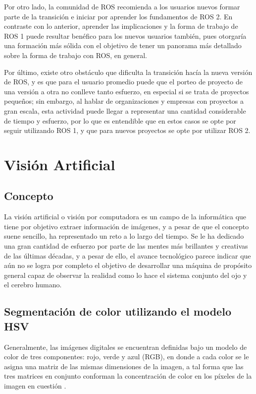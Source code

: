 Por otro lado, la comunidad de ROS recomienda a los usuarios nuevos formar parte de la transición e iniciar por aprender los fundamentos de ROS 2. En contraste con lo anterior, aprender las implicaciones y la forma de trabajo de ROS 1 puede resultar benéfico para los nuevos usuarios también, pues otorgaría una formación más sólida con el objetivo de tener un panorama más detallado sobre la forma de trabajo con ROS, en general.

Por último, existe otro obstáculo que dificulta la transición hacía la nueva versión de ROS, y es que para el usuario promedio puede que el porteo de proyecto de una versión a otra no conlleve tanto esfuerzo, en especial si se trata de proyectos pequeños; sin embargo, al hablar de organizaciones y empresas con proyectos a gran escala, esta actividad puede llegar a representar una cantidad considerable de tiempo y esfuerzo, por lo que es entendible que en estos casos se opte por seguir utilizando ROS 1, y que para nuevos proyectos se opte por utilizar ROS 2.

\section{Visión Artificial}

\subsection{Concepto}

La visión artificial o visión por computadora es un campo de la informática que tiene por objetivo extraer información de imágenes, y a pesar de que el concepto suene sencillo, ha representado un reto a lo largo del tiempo. Se le ha dedicado una gran cantidad de esfuerzo por parte de las mentes más brillantes y creativas de las últimas décadas, y a pesar de ello, el avance tecnológico parece indicar que aún no se logra por completo el objetivo de desarrollar una máquina de propósito general capaz de observar la realidad como lo hace el sistema conjunto del ojo y el cerebro humano.



\subsection{Segmentación de color utilizando el modelo HSV}

Generalmente, las imágenes digitales se encuentran definidas bajo un modelo de color de tres componentes: rojo, verde y azul (RGB), en donde a cada color se le asigna una matriz de las mismas dimensiones de la imagen, a tal forma que las tres matrices en conjunto conforman la concentración de color en los píxeles de la imagen en cuestión \cite{saravanakumar2011multiple}.


